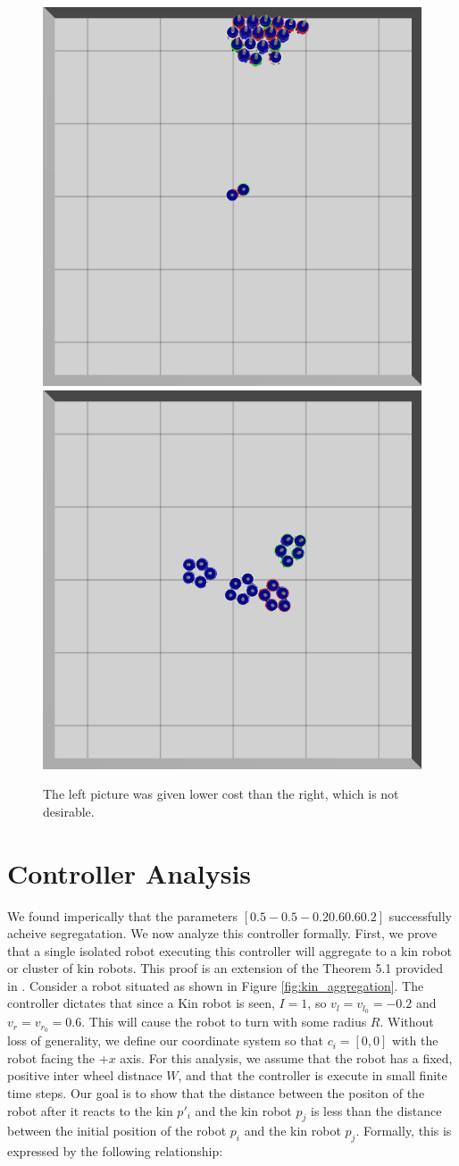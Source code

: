 \documentclass[conference]{IEEEtran}
\begin{document}
  \begin{figure}
    \centering
    \includegraphics[width=0.49\linewidth]{./images/individual_0_gen_0.png}
    \includegraphics[width=0.49\linewidth]{./images/individual_0_gen_1_better.png}
    \caption{The left picture was given lower cost than the right, which is not desirable.}
    \label{fig:cost_function_fuckup}
  \end{figure}



\section{Controller Analysis}

  We found imperically that the parameters $[0.5 -0.5 -0.2 0.6 0.6 0.2]$ successfully acheive segregatation. We now analyze this controller formally. First, we prove that a single isolated robot executing this controller will aggregate to a kin robot or cluster of kin robots. This proof is an extension of the Theorem 5.1 provided in \cite{gauci_self-organized_2014}. Consider a robot situated as shown in Figure \ref{fig:kin_aggregation}. The controller dictates that since a Kin robot is seen, $I=1$, so $v_l = v_{l_0} = -0.2$ and $v_r = v_{r_0} = 0.6$. This will cause the robot to turn with some radius $R$. Without loss of generality, we define our coordinate system so that $c_i=[0,0]$ with the robot facing the $+x$ axis. For this analysis, we assume that the robot has a fixed, positive inter wheel distnace $W$, and that the controller is execute in small finite time steps. Our goal is to show that the distance between the positon of the robot after it reacts to the kin $p'_i$ and the kin robot $p_j$ is less than the distance between the initial position of the robot $p_i$ and the kin robot $p_j$. Formally, this is expressed by the following relationship:
\end{document}
